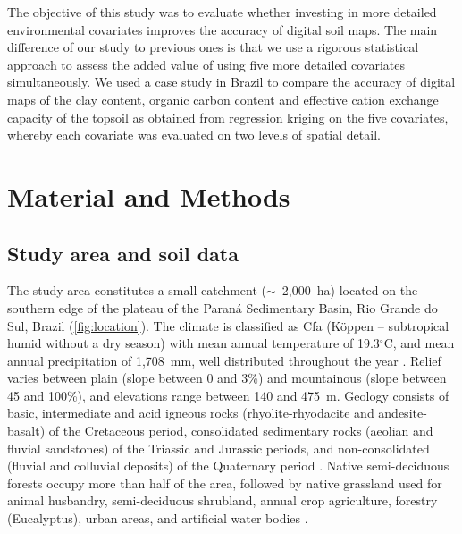 The objective of this study was to evaluate whether investing in more detailed environmental covariates 
improves the accuracy of digital soil maps. The main difference of our study to previous ones is that we use a 
rigorous statistical approach to assess the added value of using five more detailed covariates simultaneously. 
We used a case study in Brazil to compare the accuracy of digital maps of the clay content, organic carbon 
content and effective cation exchange capacity of the topsoil as obtained from regression kriging on the five 
covariates, whereby each covariate was evaluated on two levels of spatial detail.

\section{Material and Methods}
\label{sec:methods}

\subsection{Study area and soil data}
\label{subsec:soil-data}

The study area constitutes a small catchment ($\sim$~2,000~ha) located on the southern edge of the plateau of 
the Paraná Sedimentary Basin, Rio Grande do Sul, Brazil (\autoref{fig:location}). The climate is classified as 
Cfa (K\"oppen -- subtropical humid without a dry season) with mean annual temperature of 19.3$^{\circ}$C, and 
mean annual precipitation of 1,708~mm, well distributed throughout the year \cite{Maluf2000}. Relief varies 
between plain (slope between 0 and 3\%) and mountainous (slope between 45 and 100\%), and elevations range 
between 140 and 475~m. Geology consists of basic, intermediate and acid igneous rocks (rhyolite-rhyodacite and 
andesite-basalt) of the Cretaceous period, consolidated sedimentary rocks (aeolian and fluvial sandstones) of 
the Triassic and Jurassic periods, and non-consolidated (fluvial and colluvial deposits) of the Quaternary 
period \cite{GasparettoEtAl1988, MacielFilho1990, Sartori2009}. Native semi-deciduous forests occupy more than 
half of the area, followed by native grassland used for animal husbandry, semi-deciduous shrubland, annual 
crop agriculture, forestry (Eucalyptus), urban areas, and artificial water bodies \cite{SamuelRosaEtAl2011a}.

